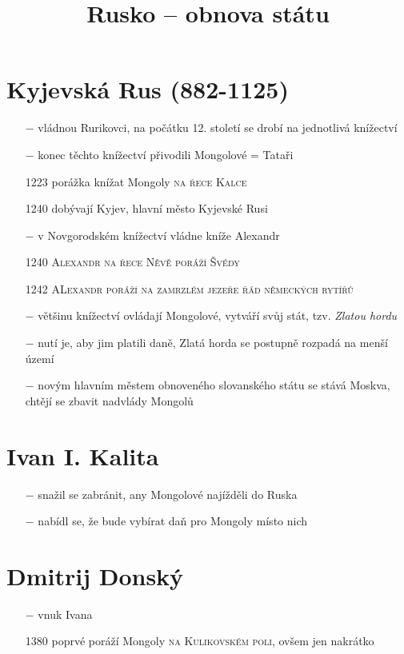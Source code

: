 \documentclass{article}
\title{\vspace{-2cm}Rusko -- obnova státu \vspace{-1.7cm}}
\date{}
\author{}
\begin{document}
\maketitle

\section*{Kyjevská Rus (882-1125)}
\begin{itemize}
    \vspace{-0.5em}
    \setlength\itemsep{0.15em}
    \item[$-$] vládnou Rurikovci, na počátku 12. století se drobí na jednotlivá knížectví
    \item[$-$] konec těchto knížectví přivodili Mongolové = Tataři
    \item[1223] porážka knížat Mongoly \textsc{na řece Kalce}
    \item[1240] dobývají Kyjev, hlavní město Kyjevské Rusi
    \item[$-$] v Novgorodském knížectví vládne kníže Alexandr
    \item[1240] \textsc{Alexandr na řece Něvě poráží Švédy}
    \item[1242]  \textsc{ALexandr poráží na zamrzlém jezeře řád německých rytířů}
    \item[$-$] většinu knížectví ovládají Mongolové, vytváří svůj stát, tzv. \textit{Zlatou hordu}
    \item[$-$] nutí je, aby jim platili daně, Zlatá horda se postupně rozpadá na menší území
    \item[$-$] novým hlavním městem obnoveného slovanského státu se stává Moskva, chtějí se zbavit nadvlády Mongolů
\end{itemize}


\section*{Ivan I. Kalita}
\begin{itemize}
    \vspace{-0.5em}
    \setlength\itemsep{0.15em}
    \item[$-$] snažil se zabránit, any Mongolové najížděli do Ruska
    \item[$-$] nabídl se, že bude vybírat daň pro Mongoly místo nich
\end{itemize}


\section*{Dmitrij Donský}
\begin{itemize}
    \vspace{-0.5em}
    \setlength\itemsep{0.15em}
    \item[$-$] vnuk Ivana
    \item[1380] poprvé poráží Mongoly \textsc{na Kulikovském poli}, ovšem jen nakrátko
\end{itemize}
\end{document}
